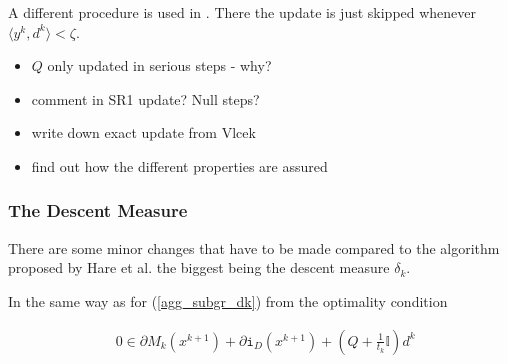 
 

A different procedure is used in \cite{Vlcek2001}. There the update is just skipped whenever \(\langle y^k, d^k \rangle < \zeta\).


\begin{itemize}
	\item \(Q\) only updated in serious steps - why?
	\item comment in SR1 update? Null steps?
	\item write down exact update from Vlcek
	\item find out how the different properties are assured
\end{itemize}





\subsubsection{The Descent Measure}

There are some minor changes that have to be made compared to the algorithm proposed by Hare et al. the biggest being the descent measure \(\delta_k\).

In the same way as for (\ref{agg_subgr_dk}) from the optimality condition

\begin{align*}
	& 0 \in \partial M_k(x^{k+1})+\partial\mathtt{i}_{D}(x^{k+1})+\left(Q+\frac{1}{t_k}\mathbb{I}\right)d^k
	\label{Noll_opt_cond}
\end{align*}

